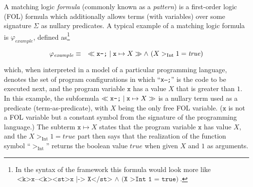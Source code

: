

A matching logic \emph{formula} (commonly known as a \emph{pattern}) is a
first-order logic (FOL) formula which additionally allows terms (with variables)
over some signature $\Sigma$ as nullary predicates.
A typical example of a matching logic formula is $\varphi_{\mathit{example}}$,
defined as\footnote{In the syntax of the \K{} framework this formula would look more like
$\texttt{<k>x--<k><st>x |-> X</st> } \land \texttt{ (X >Int  1 = true)}$.}


\begin{equation}\label{eqn:exampleMLPattern}
    \varphi_{\mathit{example}} \equiv\quad \ll\texttt{x--;}\mid \texttt{x}\mapsto X\gg  \land\ (X >_\text{Int} 1 = \mathit{true})
\end{equation}


which, when interpreted in a model of a particular programming language,
denotes the set of program configurations in which ``\texttt{x--;}'' is the
code to be executed next, and the program variable $\texttt{x}$ has a value $X$
that is greater than $1$.  In this example, the subformula
$\ll\texttt{x--;}\mid \mathtt{x}\mapsto X\gg$ is a nullary term used as a predicate
(term-as-predicate), with $X$ being the only free FOL variable.  ($\texttt{x}$
is not a FOL variable but a constant symbol from the signature of the
programming language.)  The subterm $\texttt{x}\mapsto X$ states that the
program variable $\texttt{x}$ has value $X$, and the
$X >_\text{Int} 1 = \mathit{true}$ part then says that the realization of the
function symbol ``$>_\text{Int}$'' returns the boolean value $\mathit{true}$
when given $X$ and $1$ as arguments.

